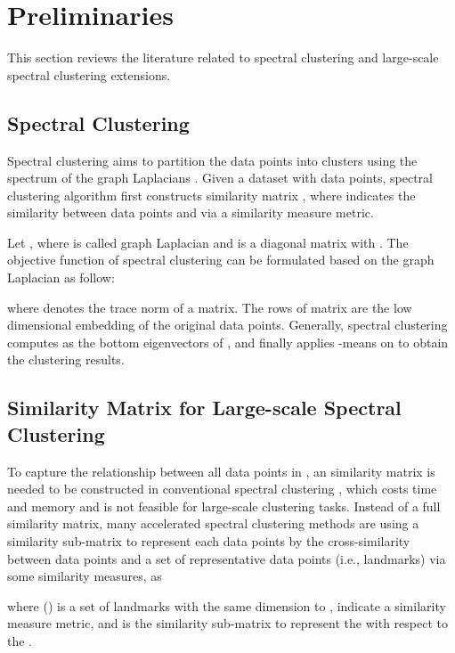 \documentclass[a4paper,fleqn]{cas-dc}
\begin{document}
\section{Preliminaries}
\label{sec:related_work}

This section reviews the literature related to spectral clustering and large-scale spectral clustering extensions.
\subsection{Spectral Clustering}

Spectral clustering aims to partition the data points into  clusters using the spectrum of the graph Laplacians \cite{von2007tutorial}.
Given a dataset  with  data points, spectral clustering algorithm first constructs similarity matrix , where  indicates the similarity between data points  and  via a similarity measure metric.

Let , where  is called graph Laplacian and  is a diagonal matrix with .
The objective function of spectral clustering can be formulated based on the graph Laplacian as follow:

where  denotes the trace norm of a matrix.
The rows of matrix  are the low dimensional embedding of the original data points.
Generally, spectral clustering computes  as the bottom  eigenvectors of , and finally applies -means on  to obtain the clustering results.


\subsection{Similarity Matrix for Large-scale Spectral Clustering}

To capture the relationship between all data points in , an  similarity matrix is needed to be constructed in conventional spectral clustering \cite{von2007tutorial}, which costs  time and  memory and is not feasible for large-scale clustering tasks.
Instead of a full similarity matrix, many accelerated spectral clustering methods \cite{fowlkes2004spectral, cai2014large, li2015superpixel, ye2018large,li2020hubness,huang2019ultra} are using a similarity sub-matrix to represent each data points by the cross-similarity between data points and a set of representative data points (i.e., landmarks) via some similarity measures, as

where  () is a set of landmarks with the same dimension to ,  indicate a similarity measure metric, and  is the similarity sub-matrix to represent the  with respect to the .
\end{document}

